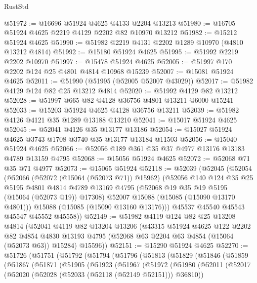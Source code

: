 \begin{lexlean}{RustStd}
\begin{coremodule}
@51972 := @16696 @51924 @4625 @4133 @2204 @13213
@51980 := @16705 @51924 @4625 @2219 @4129 @2202 @82 @10970 @13212
@51982 := @15212 @51924 @4625
@51990 := @51982 @2219 @4131 @2202 @1289 @10970 (@4810 @13212 @4814)
@51992 := @15180 @51924 @4625
@51995 := @51992 @2219 @2202 @10970
@51997 := @15478 @51924 @4625
@52005 := @51997 @170 @2202 @124 @25 @4801 @4814 @10968 @15239
@52007 := @15081 @51924 @4625
@52011 := @51990 (@51995 (@52005 @52007 @43029))
@52017 := @51982 @4129 @124 @82 @25 @13212 @4814
@52020 := @51992 @4129 @82 @13212
@52028 := @51997 @665 @82 @4128 @36756 @4801 @13211 @6000 @15241
@52033 := @15203 @51924 @4625 @4128 @36756 @13211
@52039 := @51982 @4126 @4121 @35 @1289 @13188 @13210
@52041 := @15017 @51924 @4625
@52045 := @52041 @4126 @35 @13177 @13186
@52054 := @15027 @51924 @4625 @3743 @1708 @3740 @35 @13177 @13184 @11503
@52056 := @15040 @51924 @4625
@52066 := @52056 @189 @361 @35 @37 @4977 @13176 @13183 @4789 @13159 @4795
@52068 := @15056 @51924 @4625
@52072 := @52068 @71 @35 @71 @4977
@52073 := @15065 @51924
@52118 := @52039
    (@52045
      (@52054
        (@52066
          (@52072 (@15064 (@52073 @71)) @15962)
          (@52056
            @140
            @124
            @35
            @25
            @5195
            @4801
            @4814
            @4789
            @13169
            @4795
            (@52068 @19 @35 @19 @5195 (@15064 (@52073 @19)) @17308)
            @52007
            @15088
            (@15085 (@15090 @13170 @4801)))
          @15088
          (@15085 (@15090 @13160 @13176)))
        @45537
        @45540
        @45543
        @45547
        @45552
        @45558))
@52149 := @51982
    @4119
    @124
    @82
    @25
    @13208
    @4814
    (@52041
      @4119
      @82
      @13204
      @13206
      (@43315
        @51924
        @4625
        @122
        @2202
        @82
        @4854
        @4830
        @13193
        @4795
        (@52068 @63 @2204 @63 @4854 (@15064 (@52073 @63)) @15284)
        @15596))
@52151 := @15290 @51924 @4625
@52270 := @51726
    (@51751
      (@51792
        (@51794
          (@51796
            (@51813
              (@51829
                (@51846
                  (@51859
                    (@51867
                      (@51871
                        (@51905
                          (@51923
                            (@51967
                              (@51972
                                (@51980
                                  (@52011
                                    (@52017
                                      (@52020 (@52028 (@52033 (@52118 (@52149 @52151))) @36810))

\end{coremodule}
\end{lexlean}
